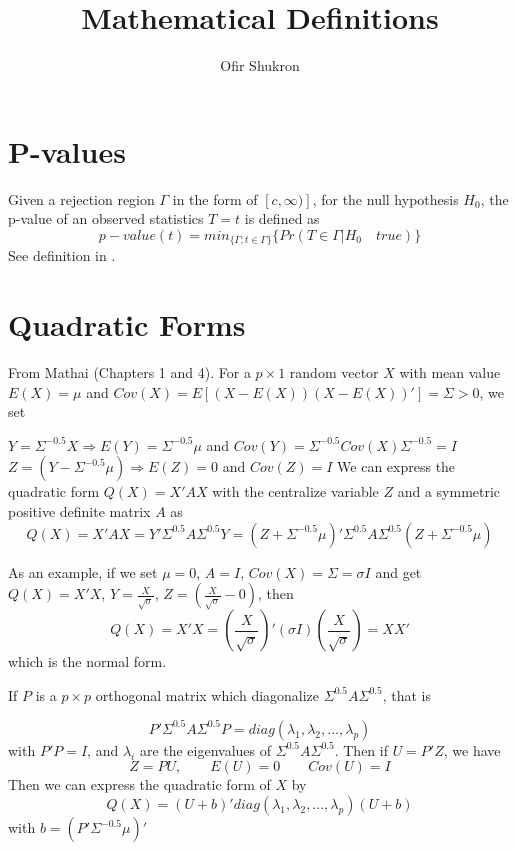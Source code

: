 \documentclass[12pt]{paper}
\begin{document}
\title{Mathematical Definitions}
\author{Ofir Shukron}
\maketitle
\section{P-values}
Given a rejection region $\Gamma$ in the form of $[c,\infty)]$, for the null hypothesis $H_0$,  the p-value of an observed statistics $T=t$ is defined as 
\begin{equation*}
p-value(t)=min_{\{\Gamma;t\in \Gamma\} } \{Pr(T\in\Gamma | H_0\quad true)\}
\end{equation*}
See definition in \cite{storey2002direct}.

\section{Quadratic Forms}\label{section_quadraticForms}
From Mathai \cite{mathai1992quadratic}(Chapters 1 and 4). For a $p\times 1$ random vector $X$ with mean value $E(X)=\mu$ and $Cov(X)=E[(X-E(X))(X-E(X))']=\Sigma>0$, we set 

$ Y=\Sigma^{-0.5}X\Rightarrow E(Y)=\Sigma^{-0.5}\mu$ and $Cov(Y)=\Sigma^{-0.5}Cov(X)\Sigma^{-0.5}=I$
$Z=(Y-\Sigma^{-0.5}\mu)\Rightarrow E(Z)=0$ and $Cov(Z)=I$ 
We can express the quadratic form $Q(X) =X'AX$ with the centralize variable $Z$ and a symmetric positive definite matrix $A$ as
\begin{equation}
Q(X)=X'AX=Y'\Sigma^{0.5}A\Sigma^{0.5}Y = (Z+\Sigma^{-0.5}\mu)'\Sigma^{0.5}A\Sigma^{0.5}(Z+\Sigma^{-0.5}\mu)	
\end{equation}

As an example, if we set $\mu = 0$, $A=I$, $Cov(X)=\Sigma=\sigma I$ and get 
$Q(X)=X'X$, $Y = \frac{X}{\sqrt{\sigma}}$, $Z=(\frac{X}{\sqrt{\sigma}}-0)$, then 
\begin{equation}
Q(X)=X'X= (\frac{X}{\sqrt{\sigma}})'(\sigma I)(\frac{X}{\sqrt{\sigma}})=XX'	
\end{equation}
which is the normal form.

If $P$ is a $p \times p$ orthogonal matrix which diagonalize $\Sigma^{0.5}A\Sigma^{0.5}$, that is 

\begin{equation*}
P'\Sigma^{0.5}A\Sigma^{0.5}P = diag(\lambda_1,\lambda_2,...,\lambda_p)
\end{equation*}
with $P'P=I$, and $\lambda_i$ are the eigenvalues of $\Sigma^{0.5} A \Sigma^{0.5}$.  Then if $U=P'Z$, we have 
\begin{equation*}
Z=PU, \qquad E(U)=0 \qquad Cov(U) = I
\end{equation*}
Then we can express the quadratic form of $X$ by 
\begin{equation}
Q(X) = (U+b)'diag(\lambda_1,\lambda_2,...,\lambda_p)(U+b)
\end{equation}
with $b = (P'\Sigma^{-0.5}\mu)'$ 


\end{document}
